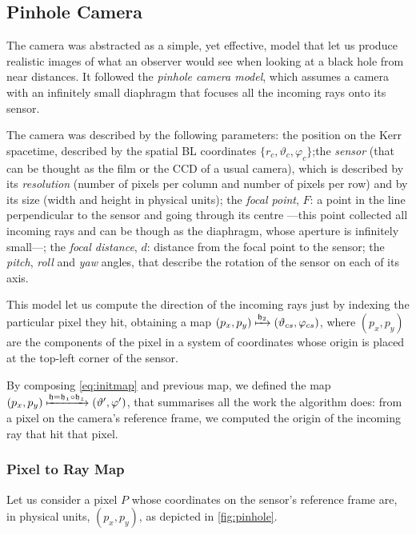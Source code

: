 \subsection{Pinhole Camera}
\label{sec:pinhole}

The camera was abstracted as a simple, yet effective, model that let us produce realistic images of what an observer would see when looking at a black hole from near distances. It followed the \emph{pinhole camera model}, which assumes a camera with an infinitely small diaphragm that focuses all the incoming rays onto its sensor.

The camera was described by the following parameters: the position on the Kerr spacetime, described by the spatial \ac{BL} coordinates $\{r_c, \vartheta_c, \varphi_c\}$;the \emph{sensor} (that can be thought as the film or the CCD of a usual camera), which is described by its \emph{resolution} (number of pixels per column and number of pixels per row) and by its size (width and height in physical units); the \emph{focal point}, $F$: a point in the line perpendicular to the sensor and going through its centre ---this point collected all incoming rays and can be though as the diaphragm, whose aperture is infinitely small---; the \emph{focal distance}, $d$: distance from the focal point to the sensor; the \emph{pitch}, \emph{roll} and \emph{yaw} angles, that describe the rotation of the sensor on each of its axis.

This model let us compute the direction of the incoming rays just by indexing the particular pixel they hit, obtaining a map $(p_x, p_y) \xmapsto{\mathfrak{h}_2} (\vartheta_{cs}, \varphi_{cs})$, where $(p_x, p_y)$ are the components of the pixel in a system of coordinates whose origin is placed at the top-left corner of the sensor.

By composing \autoref{eq:initmap} and previous map, we defined the map $(p_x, p_y) \xmapsto{\mathfrak{h} = \mathfrak{h_1}\circ\mathfrak{h_2}} (\vartheta', \varphi')$, that summarises all the work the algorithm does: from a pixel on the camera's reference frame, we computed the origin of the incoming ray that hit that pixel.

\subsubsection*{Pixel to Ray Map}
\label{subcsec:pixeltoray}

Let us consider a pixel $P$ whose coordinates on the sensor's reference frame are, in physical units, $(p_x, p_y)$, as depicted in \autoref{fig:pinhole}.

